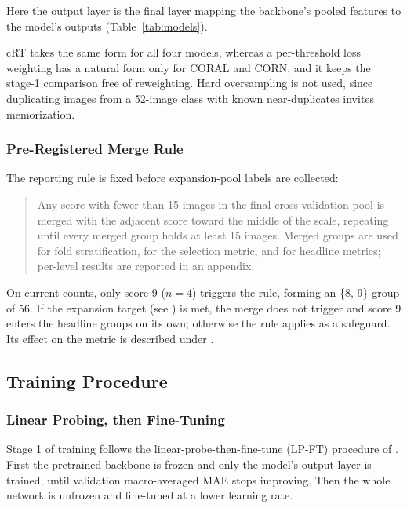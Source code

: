 \documentclass{icsthesis}
\newcommand{\secref}[1]{\textit{\nameref{#1}}}
\begin{document}
\begin{mainmatter}
					Here the output layer is the final layer mapping the backbone's
					pooled features to the model's outputs (Table~\ref{tab:models}).

					cRT takes the same form for all four models, whereas a per-threshold
					loss weighting has a natural form only for CORAL and CORN, and it
					keeps the stage-1 comparison free of reweighting. Hard oversampling
					is not used, since duplicating images from a 52-image class with
					known near-duplicates invites memorization.

				\subsubsection{Pre-Registered Merge Rule}\label{sec:merge}

					The reporting rule is fixed before expansion-pool labels are collected:

					\begin{quote}
						\singlespacing
						Any score with fewer than 15 images in the final cross-validation pool is
						merged with the adjacent score toward the middle of the scale, repeating
						until every merged group holds at least 15 images. Merged groups are used
						for fold stratification, for the selection metric, and for headline metrics;
						per-level results are reported in an appendix.
					\end{quote}

					On current counts, only score 9 ($n = 4$) triggers the rule, forming an \{8, 9\} group of 56. If the expansion target (see \secref{sec:expansion}) is met, the merge does not
					trigger and score 9 enters the headline groups on its own; otherwise the rule
					applies as a safeguard. Its effect on the metric is described under
					\secref{sec:selmetric}.

			\subsection{Training Procedure}\label{sec:training}

				\subsubsection{Linear Probing, then Fine-Tuning}\label{sec:lpft}

					Stage 1 of training follows the linear-probe-then-fine-tune (LP-FT) procedure of
					\citet{kumar2022}. First the pretrained backbone is frozen and only the model's
					output layer is trained, until validation macro-averaged MAE stops improving.
					Then the whole network is unfrozen and fine-tuned at a lower learning rate.


\end{mainmatter}
\end{document}
